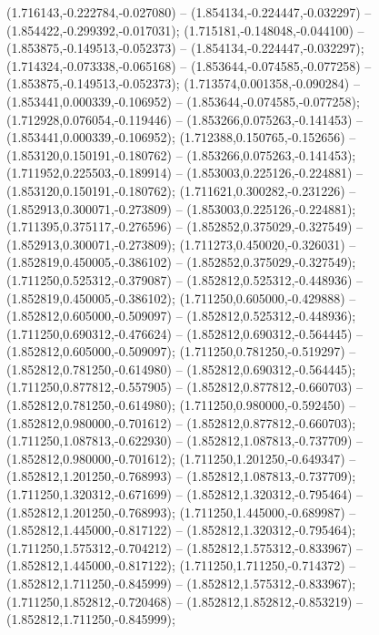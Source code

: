  (1.716143,-0.222784,-0.027080) -- (1.854134,-0.224447,-0.032297) -- (1.854422,-0.299392,-0.017031);
 (1.715181,-0.148048,-0.044100) -- (1.853875,-0.149513,-0.052373) -- (1.854134,-0.224447,-0.032297);
 (1.714324,-0.073338,-0.065168) -- (1.853644,-0.074585,-0.077258) -- (1.853875,-0.149513,-0.052373);
 (1.713574,0.001358,-0.090284) -- (1.853441,0.000339,-0.106952) -- (1.853644,-0.074585,-0.077258);
 (1.712928,0.076054,-0.119446) -- (1.853266,0.075263,-0.141453) -- (1.853441,0.000339,-0.106952);
 (1.712388,0.150765,-0.152656) -- (1.853120,0.150191,-0.180762) -- (1.853266,0.075263,-0.141453);
 (1.711952,0.225503,-0.189914) -- (1.853003,0.225126,-0.224881) -- (1.853120,0.150191,-0.180762);
 (1.711621,0.300282,-0.231226) -- (1.852913,0.300071,-0.273809) -- (1.853003,0.225126,-0.224881);
 (1.711395,0.375117,-0.276596) -- (1.852852,0.375029,-0.327549) -- (1.852913,0.300071,-0.273809);
 (1.711273,0.450020,-0.326031) -- (1.852819,0.450005,-0.386102) -- (1.852852,0.375029,-0.327549);
 (1.711250,0.525312,-0.379087) -- (1.852812,0.525312,-0.448936) -- (1.852819,0.450005,-0.386102);
 (1.711250,0.605000,-0.429888) -- (1.852812,0.605000,-0.509097) -- (1.852812,0.525312,-0.448936);
 (1.711250,0.690312,-0.476624) -- (1.852812,0.690312,-0.564445) -- (1.852812,0.605000,-0.509097);
 (1.711250,0.781250,-0.519297) -- (1.852812,0.781250,-0.614980) -- (1.852812,0.690312,-0.564445);
 (1.711250,0.877812,-0.557905) -- (1.852812,0.877812,-0.660703) -- (1.852812,0.781250,-0.614980);
 (1.711250,0.980000,-0.592450) -- (1.852812,0.980000,-0.701612) -- (1.852812,0.877812,-0.660703);
 (1.711250,1.087813,-0.622930) -- (1.852812,1.087813,-0.737709) -- (1.852812,0.980000,-0.701612);
 (1.711250,1.201250,-0.649347) -- (1.852812,1.201250,-0.768993) -- (1.852812,1.087813,-0.737709);
 (1.711250,1.320312,-0.671699) -- (1.852812,1.320312,-0.795464) -- (1.852812,1.201250,-0.768993);
 (1.711250,1.445000,-0.689987) -- (1.852812,1.445000,-0.817122) -- (1.852812,1.320312,-0.795464);
 (1.711250,1.575312,-0.704212) -- (1.852812,1.575312,-0.833967) -- (1.852812,1.445000,-0.817122);
 (1.711250,1.711250,-0.714372) -- (1.852812,1.711250,-0.845999) -- (1.852812,1.575312,-0.833967);
 (1.711250,1.852812,-0.720468) -- (1.852812,1.852812,-0.853219) -- (1.852812,1.711250,-0.845999);
